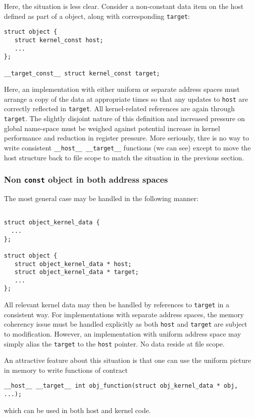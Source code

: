 Here, the situation is less clear. Consider a non-constant data item
on the host defined as part of a object, along with corresponding
\texttt{target}:
\begin{lstlisting}
struct object {
   struct kernel_const host;
   ...
};

__target_const__ struct kernel_const target;

\end{lstlisting}
Here, an implementation with either uniform or separate address
spaces must arrange a copy of the data at appropriate times so
that any updates to \texttt{host} are correctly reflected
in \texttt{target}. All kernel-related references are again through
\texttt{target}.
The slightly disjoint nature of this definition and increased pressure
on global name-space must be weighed against potential increase in kernel
performance and reduction in register pressure. More seriously, thre is
no way to write consistent \texttt{\_\_host\_\_ \_\_target\_\_} functions
(we can see) except to move the host structure back to file scope to
match the situation in the previous section.

\subsubsection{Non \texttt{const} object in both address spaces}

The most general case may be handled in the following manner:
\begin{lstlisting}

struct object_kernel_data {
  ...
};

struct object {
   struct object_kernel_data * host;
   struct object_kernel_data * target;
   ...
};

\end{lstlisting}
All relevant kernel data may then be handled by references to
\texttt{target} in a consistent way. For implementations with
separate address spaces, the memory coherency issue
must be handled explicitly as both \texttt{host} and \texttt{target}
are subject to modification. However, an implementation with uniform
address space may simply alias the \texttt{target} to the \texttt{host}
pointer. No data reside at file scope.

An attractive feature about this situation is that one can use the
uniform picture in memory to write functions of contract
\begin{lstlisting}
__host__ __target__ int obj_function(struct obj_kernel_data * obj, ...);
\end{lstlisting}
which can be used in both host and kernel code.

